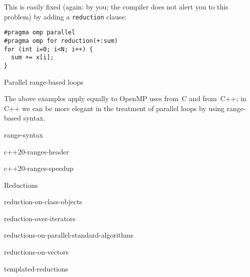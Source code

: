 This is easily fixed
(again: by you; the compiler does not alert you to this problem)
by adding a \lstinline{reduction} clause:
\begin{lstlisting}
#pragma omp parallel
#pragma omp for reduction(+:sum)
for (int i=0; i<N; i++) {
  sum += x[i];
}
\end{lstlisting}

 {Parallel range-based loops}

The above examples apply equally to OpenMP uses from~C and from~C++;
in C++ we can be more elegant in the treatment of parallel loops
by using range-based syntax.

\begin{block}{range-syntax}
    
\end{block}

\begin{block}{c++20-ranges-header}
    
\end{block}

\begin{block}{c++20-ranges-speedup}
    
\end{block}

 {Reductions}

\begin{block}{reduction-on-class-objects}
    
\end{block}

\begin{block}{reduction-over-iterators}
    
\end{block}

\begin{block}{reductions-on-parallel-standard-algorithms}
    
\end{block}

\begin{block}{reductions-on-vectors}
    
\end{block}

\begin{block}{templated-reductions}
    
\end{block}


